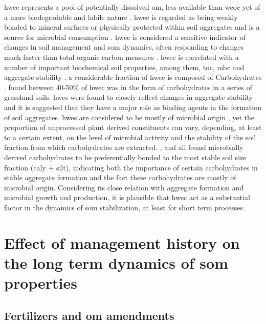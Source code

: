 	\gls{hwec} represents a pool of potentially dissolved \gls{om}, less available than \gls{weoc} yet of a more biodegradable and labile nature \citep{chantigny2014, leinweber1995, gregorich2003}. \gls{hwec} is regarded as being weakly bonded to mineral surfaces or physically protected within soil aggregates and is a source for microbial consumption \citep{zakharova2015, leinweber1995}.
	\gls{hwec} is considered a  sensitive indicator of changes in soil management and \gls{som} dynamics, often responding to changes much faster than total organic carbon measures \citep{ghani2003}. \gls{hwec} is correlated with a number of important biochemical soil properties, among them, \gls{toc}, \gls{mbc} and aggregate stability \citep{hamkalo2014}.
	a considerable fraction of \gls{hwec} is composed of Carbohydrates \citep{leinweber1995, balaria2009}. \citet{ghani2003} found between 40-50\% of \gls{hwec} was in the form of carbohydrates in a series of grassland soils.
	\gls{hwes} were found to  closely reflect changes in aggregate stability \citep{haynes2005, yousefi2008, leguillou2012} and it is suggested that they have a major role as binding agents in the formation of soil aggregates.
	\gls{hwes} are considered to be mostly of microbial origin \citep{haynes1993, debosz2002}, yet the proportion of unprocessed plant derived constituents can vary, depending, at least to a certain extent, on the level of microbial activity and the stability of the soil fraction from which carbohydrates are extracted. \citet{puget1998}, \citet{jolivet2006} and \citet{bock2007} all found microbially derived carbohydrates to be preferentially bonded to the most stable soil size fraction (caly + silt), indicating both the importance of certain  carbohydrates in stable aggregate formation and the fact these carbohydrates are mostly of microbial origin.
	Considering its close relation with aggregate formation and microbial growth and production, it is plausible that \gls{hwec} act as a substantial factor in  the dynamics of \gls{som} stabilization, at least for short term processes.

\section{Effect of management history on the long term dynamics of \gls{som} properties}

 	\subsection{Fertilizers and \gls{om} amendments}

